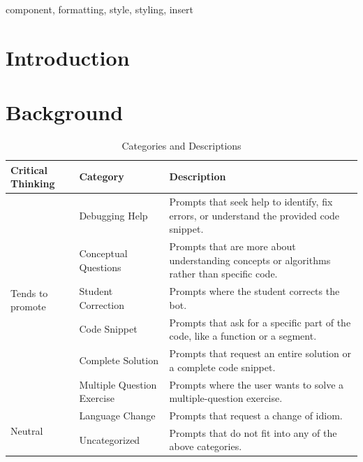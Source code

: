 \documentclass[conference]{IEEEtran}
\begin{document}
\begin{IEEEkeywords}
component, formatting, style, styling, insert
\end{IEEEkeywords}

\section{Introduction}






\section{Background}

\begin{table}[htbp]
\caption{Categories and Descriptions}
    \begin{center}
    \begin{tabular}{|p{3cm}|p{3cm}|p{5cm}|}
    \hline
    \textbf{Critical Thinking} & \textbf{Category} & \textbf{Description} \\
    \hline
    \multirow{6}{3cm}{Tends to promote} & Debugging Help & Prompts that seek
    help to identify, fix errors, or understand the provided code snippet. \\
    & Conceptual Questions & Prompts that are more about understanding concepts
    or algorithms rather than specific code. \\
    & Student Correction & Prompts where the student corrects the bot. \\
    \hline
    \multirow{6}{3cm}{Tends not to promote} & Code Snippet & Prompts that ask
    for a specific part of the code, like a function or a segment. \\
    & Complete Solution & Prompts that request an entire solution or a complete
    code snippet. \\
    & Multiple Question Exercise & Prompts where the user wants to solve a
    multiple-question exercise. \\
    \hline
    \multirow{3}{3cm}{Neutral} & Language Change & Prompts that request a change
    of idiom. \\
    & Uncategorized & Prompts that do not fit into any of the above categories. \\
    \hline
    \end{tabular}
    \label{tab:categories}
    \end{center}
\end{table}
\end{document}
